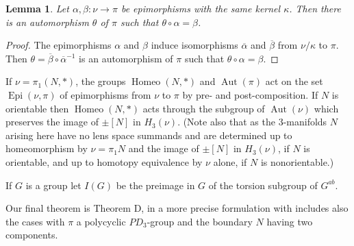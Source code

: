 \documentclass[12pt]{amsart}
\newtheorem{lemma}[theorem]{Lemma}
\theoremstyle{definition}
\DeclareMathOperator{\Aut}{Aut}
\DeclareMathOperator{\Epi}{Epi}
\DeclareMathOperator{\Homeo}{Homeo}
\begin{document}
\begin{lemma}
\label{epiaut}
Let $\alpha,\beta:\nu\to\pi$ be epimorphisms with the same kernel $\kappa$.
Then there is an automorphism $\theta$ of $\pi$ such that $\theta\circ\alpha=\beta$.
\end{lemma}

\begin{proof}
The epimorphisms $\alpha$ and $\beta$ induce isomorphisms
$\overline\alpha$ and $\overline\beta$ from $\nu/\kappa$ to $\pi$.
Then $\theta=\overline\beta\circ\overline\alpha^{-1}$ is an automorphism of $\pi$ such that $\theta\circ\alpha=\beta$.
\end{proof}

If $\nu = \pi_1(N,*)$, the groups $\Homeo(N,*)$ and $\Aut(\pi)$ act on the set $\Epi(\nu,\pi)$ 
of epimorphisms from $\nu$ to $\pi$ by pre- and post-composition.
If $N$ is orientable then $\Homeo(N,*)$ acts through the subgroup of $\Aut(\nu)$ which preserves the image of $\pm[N]$ in $H_3(\nu)$.
(Note also that as the 3-manifolds $N$ arising here have no lens space
summands and are determined up to homeomorphism  by $\nu=\pi_1N$
and the image of $\pm[N]$ in $H_3(\nu)$, if $N$ is orientable,
and up to homotopy equivalence by $\nu$ alone,
if $N$ is nonorientable.)

If $G$ is a group let $I(G)$ be the preimage in $G$ of the torsion subgroup of $G^{ab}$.

Our final theorem is Theorem  D,  
in a more precise formulation with includes also the
cases with $\pi$ a polycyclic $PD_3$-group and the boundary $N$ having two components.
\end{document}
